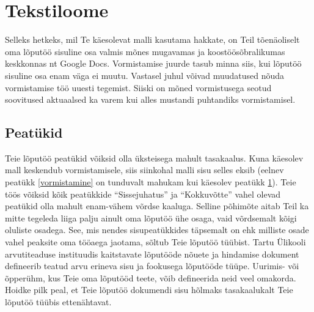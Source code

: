 \section{Tekstiloome} \label{tekstiloome}
Selleks hetkeks, mil Te käesolevat malli kasutama hakkate, on Teil tõenäoliselt oma lõputöö sisuline osa valmis mõnes mugavamas ja koostöösõbralikumas keskkonnas nt Google Docs. Vormistamise juurde tasub minna siis, kui lõputöö sisuline osa enam väga ei muutu. Vastasel juhul võivad muudatused nõuda vormistamise töö uuesti tegemist. Siiski on mõned vormistusega seotud soovitused aktuaalsed ka varem kui alles mustandi puhtandiks vormistamisel.

\subsection{Peatükid}
Teie lõputöö peatükid võiksid olla üksteisega mahult tasakaalus. Kuna käesolev mall keskendub vormistamisele, siis siinkohal malli sisu selles eksib (eelnev peatükk \ref{vormistamine} on tunduvalt mahukam kui käesolev peatükk \ref{tekstiloome}). Teie töös võiksid kõik peatükkide “Sissejuhatus” ja “Kokkuvõtte” vahel olevad peatükid olla mahult enam-vähem võrdse kaaluga. Selline põhimõte aitab Teil ka mitte tegeleda liiga palju ainult oma lõputöö ühe osaga, vaid võrdsemalt kõigi oluliste osadega. See, mis nendes sisupeatükkides täpsemalt on ehk milliste osade vahel peaksite oma tööaega jaotama, sõltub Teie lõputöö tüübist. Tartu Ülikooli arvutiteaduse instituudis kaitstavate lõputööde nõuete ja hindamise dokument defineerib teatud arvu erineva sisu ja fookusega lõputööde tüüpe. Uurimis- või õpperühm, kus Teie oma lõputööd teete, võib defineerida neid veel omakorda. Hoidke pilk peal, et Teie lõputöö dokumendi sisu hõlmaks tasakaalukalt Teie lõputöö tüübis ettenähtavat.

